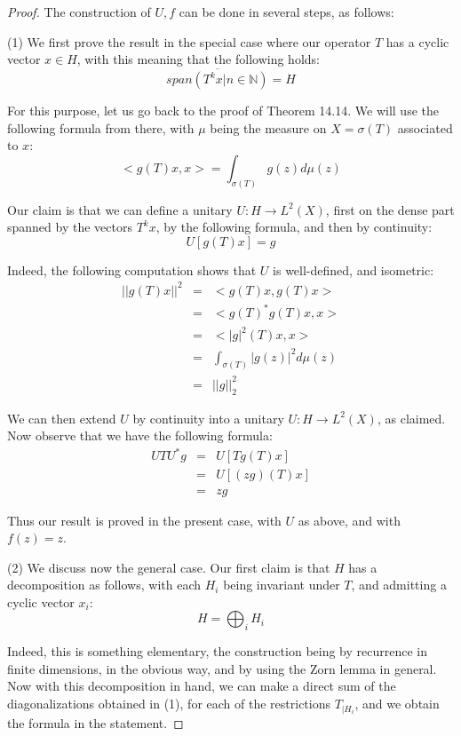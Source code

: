 \documentclass[12pt]{amsbook}
\begin{document}
\begin{proof}
The construction of $U,f$ can be done in several steps, as follows:

\medskip

(1) We first prove the result in the special case where our operator $T$ has a cyclic vector $x\in H$, with this meaning that the following holds:
$$\overline{span\left(T^kx\Big|n\in\mathbb N\right)}=H$$

For this purpose, let us go back to the proof of Theorem 14.14. We will use the following formula from there, with $\mu$ being the measure on $X=\sigma(T)$ associated to $x$:
$$<g(T)x,x>=\int_{\sigma(T)}g(z)d\mu(z)$$

Our claim is that we can define a unitary $U:H\to L^2(X)$, first on the dense part spanned by the vectors $T^kx$, by the following formula, and then by continuity:
$$U[g(T)x]=g$$

Indeed, the following computation shows that $U$ is well-defined, and isometric:
\begin{eqnarray*}
||g(T)x||^2
&=&<g(T)x,g(T)x>\\
&=&<g(T)^*g(T)x,x>\\
&=&<|g|^2(T)x,x>\\
&=&\int_{\sigma(T)}|g(z)|^2d\mu(z)\\
&=&||g||_2^2
\end{eqnarray*}

We can then extend $U$ by continuity into a unitary $U:H\to L^2(X)$, as claimed. Now observe that we have the following formula:
\begin{eqnarray*}
UTU^*g
&=&U[Tg(T)x]\\
&=&U[(zg)(T)x]\\
&=&zg
\end{eqnarray*} 

Thus our result is proved in the present case, with $U$ as above, and with $f(z)=z$.

\medskip

(2) We discuss now the general case. Our first claim is that $H$ has a decomposition as follows, with each $H_i$ being invariant under $T$, and admitting a cyclic vector $x_i$:
$$H=\bigoplus_iH_i$$

Indeed, this is something elementary, the construction being by recurrence in finite dimensions, in the obvious way, and by using the Zorn lemma in general. Now with this decomposition in hand, we can make a direct sum of the diagonalizations obtained in (1), for each of the restrictions $T_{|H_i}$, and we obtain the formula in the statement.
\end{proof}
\end{document}
